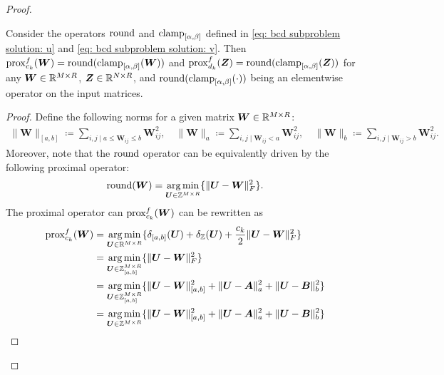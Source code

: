 \begin{proof}
    \begin{lem}
        Consider the operators $\operatorname{round}$ and $\operatorname{clamp}_{[\alpha,\beta]}$ defined in \eqref{eq: bcd subproblem solution: u} and \eqref{eq: bcd subproblem solution: v}.
        Then $\operatorname{prox}^f_{c_k}(\bm W) = \operatorname{round}(\operatorname{clamp}_{[\alpha,\beta]}(\bm W))$ and $\operatorname{prox}^f_{d_k}(\bm Z) = \operatorname{round}(\operatorname{clamp}_{[\alpha,\beta]}(\bm Z))$ for any $\bm W\in \mathbb{R}^{M\times R}$, $\bm Z\in\mathbb{R}^{N\times R}$, and $\operatorname{round}(\operatorname{clamp}_{[\alpha,\beta]}(\cdot))$ being an elementwise operator on the input matrices.
    \end{lem}
    \begin{proof}
        Define the following norms for a given matrix $\bm W \in \mathbb{R}^{M\times R}$:
        \begin{align*}
            \|\bm W\|_{[a,b]} \coloneqq \sum_{i,j \mid a \leq \bm W_{ij} \leq b} \bm W_{ij}^2, \quad 
            \|\bm W\|_a \coloneqq \sum_{i,j \mid \bm W_{ij} < a} \bm W_{ij}^2, \quad 
            \|\bm W\|_b \coloneqq \sum_{i,j \mid \bm W_{ij} > b} \bm W_{ij}^2.
        \end{align*}
        Moreover, note that the $\operatorname{round}$ operator  can be equivalently driven by the following proximal operator:
        \begin{equation}
            \operatorname{round}(\bm W) = \operatorname*{arg\,min}_{\bm U \in \mathbb Z^{M\times R}}\{\|\bm U - \bm W\|^2_F\}.
            \label{eq:equivalence_prox_Tz}
        \end{equation}
        The proximal operator can $\operatorname{prox}^f_{c_k}(\bm W)$ can be rewritten as
        \begin{align*}
            \prox^f_{c_k}(\bm W) &= \argmin_{\bm U \in \R^{M\times R}}\{\delta_{[a,b]}(\bm U) + \delta_{\Z}(\bm U) + \frac{c_k}{2} \|\bm U - \bm W\|^2_F\}\\
            &= \argmin_{\bm U \in \Z_{[a,b]}^{M\times R}}\{\|\bm U - \bm W\|^2_F\}\\
            &= \argmin_{\bm U \in \Z_{[a,b]}^{M\times R}}\{\|\bm U - \bm W\|^2_{[a,b]} + \|\bm U - \bm A\|^2_a + \|\bm U - \bm B\|^2_b\}\\
            &= \argmin_{\bm U \in \Z^{M\times R}}\{\|\bm U - \bm W\|^2_{[a,b]} + \|\bm U - \bm A\|^2_a + \|\bm U - \bm B\|^2_b\}\\

\end{align*}
\end{proof}
\end{proof}
